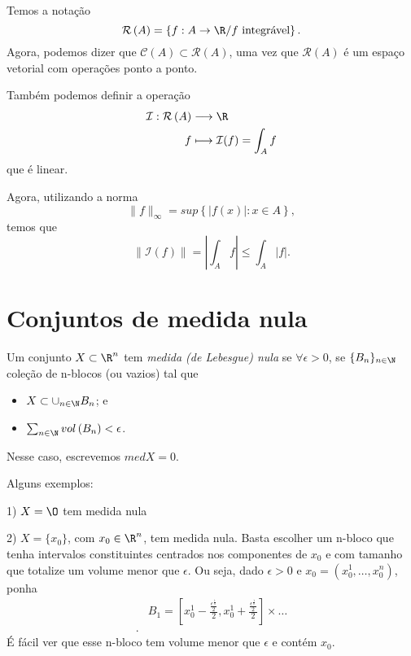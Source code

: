 
Temos a notação \[
\mathcal{R}\left( A \right) = \left\{ f:A\to \R / f \text{ integrável} \right\} 
.\] Agora, podemos dizer que $\mathcal{C}\left( A \right) \subset \mathcal{R}\left( A \right) $, uma vez que $\mathcal{R}\left( A \right) $ é um espaço vetorial com operações ponto a ponto.

Também podemos definir a operação
\begin{align*}
    \mathcal{I}: \mathcal{R}\left( A \right)  &\longrightarrow \R \\
    f &\longmapsto \mathcal{I}(f) = \int_A f
\end{align*}
que é linear.

Agora, utilizando a norma \[
    \|f\|_{\infty} = sup\left\{ |f\left( x \right) | : x\in A \right\} 
,\] temos que \[
\|\mathcal{I}\left( f \right) \| = \left| \int_A f \right| \le \int_A \left| f \right| 
.\] 

\section*{Conjuntos de medida nula}

\begin{definition}
    Um conjunto $X\subset \R^{n}$ tem \emph{medida (de Lebesgue) nula} se $\forall \epsilon>0$, se $\{B_n\}_{n\in \N}$ coleção de n-blocos (ou vazios) tal que
    \begin{itemize}
        \item $X \subset \cup_{n\in \N}B_n$; e
	\item $\sum_{n\in \N} vol\left( B_n \right) < \epsilon$.
    \end{itemize}
    Nesse caso, escrevemos $med X = 0$.
\end{definition}

Alguns exemplos:
\begin{eg}
    1) $X=\O$ tem medida nula
\end{eg}
\begin{eg}
    2) $X = \{x_0\}$, com $x_0\in \R^{n}$, tem medida nula. Basta escolher um n-bloco que tenha intervalos constituintes centrados nos componentes de $x_0$ e com tamanho que totalize um volume menor que $\epsilon$. Ou seja, dado $\epsilon>0$ e $x_0 = \left( x_0^{1},\ldots,x_0^{n} \right) $, ponha 
    \begin{align*}
    & B_1 = \left[ x_0^{1}-\frac{\frac{\epsilon^{\frac{1}{n}}}{2}}{2}, x_0^{1}+\frac{\frac{\epsilon^{\frac{1}{n}}}{2}}{2}  \right] \times \ldots \\
    .\end{align*}
    É fácil ver que esse n-bloco tem volume menor que $\epsilon$ e contém $x_0$.
\end{eg}

